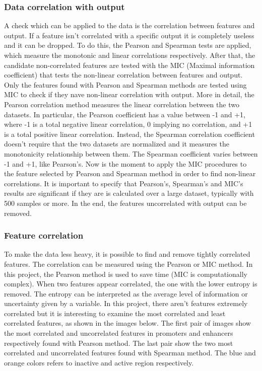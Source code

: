 \subsubsection{Data correlation with output}

A check which can be applied to the data is the correlation between
features and output. If a feature isn't correlated with a specific
output it is completely useless and it can be dropped. To do this, the
Pearson and Spearman tests are applied, which measure the monotonic and
linear correlations respectively. After that, the candidate
non-correlated features are tested with the MIC (Maximal information
coefficient) that tests the non-linear correlation between features and
output. Only the features found with Pearson and Spearman methods are
tested using MIC to check if they nave non-linear correlation with
output. More in detail, the Pearson correlation method measures the
linear correlation between the two datasets. In particular, the Pearson
coefficient has a value between -1 and +1, where -1 is a total negative
linear correlation, 0 implying no correlation, and +1 is a total
positive linear correlation. Instead, the Spearman correlation
coefficient doesn't require that the two datasets are normalized and it
measures the monotonicity relationship between them. The Spearman
coefficient varies between -1 and +1, like Pearson's. Now is the moment
to apply the MIC procedures to the feature selected by Pearson and
Spearman method in order to find non-linear correlations. It is
important to specify that Pearson's, Spearman's and MIC's results are
significant if they are is calculated over a large dataset, typically
with 500 samples or more. In the end, the features uncorrelated with
output can be removed.

\subsubsection{Feature correlation}

To make the data less heavy, it is possible to find and remove tightly
correlated features. The correlation can be measured using the Pearson
or MIC method. In this project, the Pearson method is used to save time
(MIC is computationally complex). When two features appear correlated,
the one with the lower entropy is removed. The entropy can be
interpreted as the average level of information or uncertainty given by
a variable. In this project, there aren't features extremely correlated
but it is interesting to examine the most correlated and least
correlated features, as shown in the images below. The first pair of
images show the most correlated and uncorrelated features in promoters
and enhancers respectively found with Pearson method. The last pair
show the two most correlated and uncorrelated features found with
Spearman method. The blue and orange colors refers to inactive and
active region respectively.

